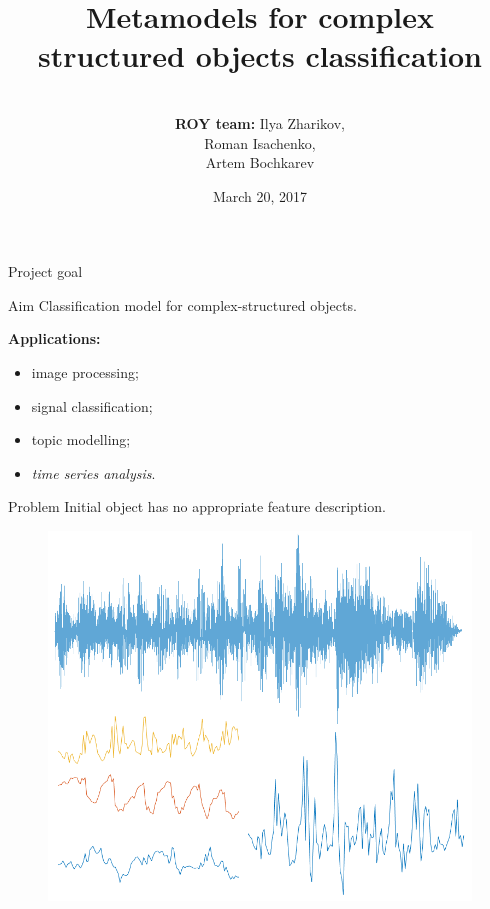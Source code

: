 \documentclass{beamer}
\title[\hbox to 56mm{Human Activity Recognition  \hfill\insertframenumber\,/\,\inserttotalframenumber}]
{Metamodels for complex structured objects classification}
\author[ROY team]{\\
	{\small \textbf{ROY team:} Ilya Zharikov, \\ \hspace{2.67cm}Roman Isachenko, \\ \hspace{2.61cm}Artem Bochkarev}}
\institute[SkolTech]{Skolkovo Institute of Science and Technology \\
	Machine Learning course 
	\vspace{0.3cm}
}
\date{March 20, 2017}
\begin{document}
	\begin{frame}
		\titlepage
	\end{frame}
\begin{frame}{Project goal}
		
		\begin{minipage}[t]{0.45\columnwidth}
			\begin{block}{Aim}
				Classification model for complex-structured objects.
			\end{block}
			
			\vspace{1.5cm}
			
			\textbf{Applications:}
			\begin{itemize}
				\item image processing;
				\item signal classification;
				\item topic modelling;
				\item \textit{time series analysis}.
			\end{itemize}
		\end{minipage}
		\hfill
		\begin{minipage}[t]{0.45\columnwidth}
			\begin{block}{Problem}
				Initial object has no appropriate feature description.
			\end{block}
			\begin{figure}[h]
				\centering
				\includegraphics[width=0.9\linewidth]{app_example.png}
			\end{figure}
		\end{minipage}
		
\end{frame}
\end{document}
